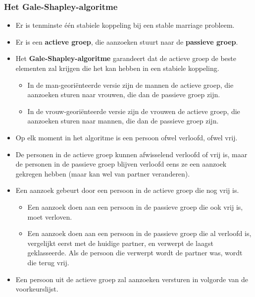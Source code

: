 \subsubsection{Het Gale-Shapley-algoritme}
\begin{itemize}
    \item Er is tenminste één stabiele koppeling bij een stable marriage probleem.
    \item Er is een \textbf{actieve groep}, die aanzoeken stuurt naar de \textbf{passieve groep}.
    \item Het \textbf{Gale-Shapley-algoritme} garandeert dat de actieve groep de beste elementen zal krijgen die het kan hebben in een stabiele koppeling.
    \begin{itemize}
        \item In de man-georiënteerde versie zijn de mannen de actieve groep, die aanzoeken sturen naar vrouwen, die dan de passieve groep zijn.
        \item In de vrouw-georiënteerde versie zijn de vrouwen de actieve groep, die aanzoeken sturen naar mannen, die dan de passieve groep zijn.
    \end{itemize}
    \item Op elk moment in het algoritme is een persoon ofwel verloofd, ofwel vrij.
    \item De personen in de actieve groep kunnen afwisselend verloofd of vrij is, maar de personen in de passieve groep blijven verloofd eens ze een aanzoek gekregen hebben (maar kan wel van partner veranderen).
    \item Een aanzoek gebeurt door een persoon in de actieve groep die nog vrij is.
    \begin{itemize}
        \item Een aanzoek doen aan een persoon in de passieve groep die ook vrij is, moet verloven.
        \item Een aanzoek doen aan een persoon in de passieve groep die al verloofd is, vergelijkt eerst met de huidige partner, en verwerpt de laagst geklasseerde. Als de persoon die verwerpt wordt de partner was, wordt die terug vrij.
    \end{itemize}
    \item Een persoon uit de actieve groep zal aanzoeken versturen in volgorde van de voorkeurslijst.

\end{itemize}

